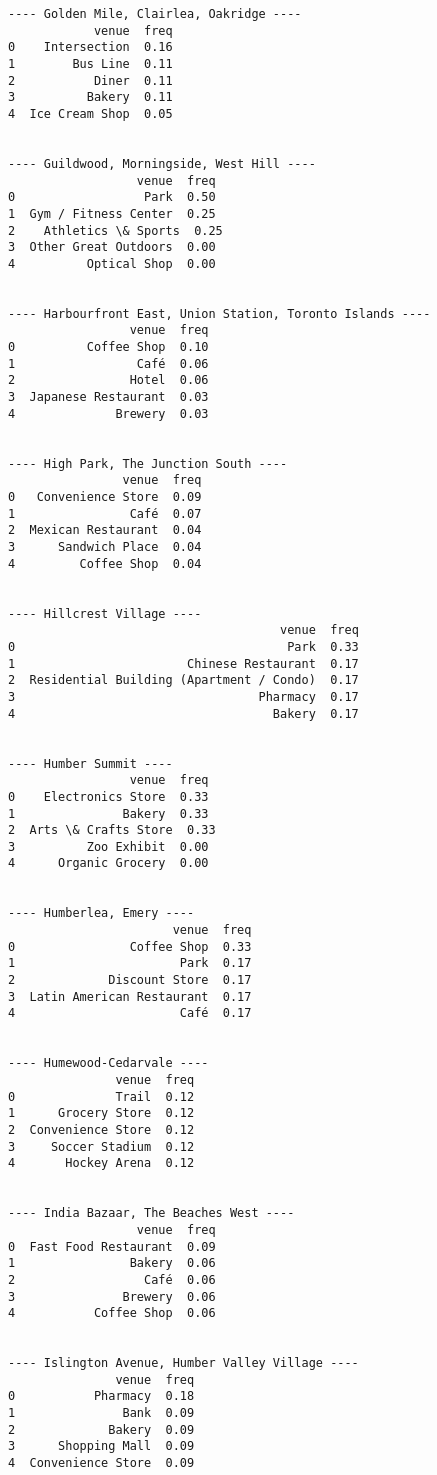 \documentclass[11pt]{article}
\begin{document}
\begin{Verbatim}[commandchars=\\\{\}]
---- Golden Mile, Clairlea, Oakridge ----
            venue  freq
0    Intersection  0.16
1        Bus Line  0.11
2           Diner  0.11
3          Bakery  0.11
4  Ice Cream Shop  0.05


---- Guildwood, Morningside, West Hill ----
                  venue  freq
0                  Park  0.50
1  Gym / Fitness Center  0.25
2    Athletics \& Sports  0.25
3  Other Great Outdoors  0.00
4          Optical Shop  0.00


---- Harbourfront East, Union Station, Toronto Islands ----
                 venue  freq
0          Coffee Shop  0.10
1                 Café  0.06
2                Hotel  0.06
3  Japanese Restaurant  0.03
4              Brewery  0.03


---- High Park, The Junction South ----
                venue  freq
0   Convenience Store  0.09
1                Café  0.07
2  Mexican Restaurant  0.04
3      Sandwich Place  0.04
4         Coffee Shop  0.04


---- Hillcrest Village ----
                                      venue  freq
0                                      Park  0.33
1                        Chinese Restaurant  0.17
2  Residential Building (Apartment / Condo)  0.17
3                                  Pharmacy  0.17
4                                    Bakery  0.17


---- Humber Summit ----
                 venue  freq
0    Electronics Store  0.33
1               Bakery  0.33
2  Arts \& Crafts Store  0.33
3          Zoo Exhibit  0.00
4      Organic Grocery  0.00


---- Humberlea, Emery ----
                       venue  freq
0                Coffee Shop  0.33
1                       Park  0.17
2             Discount Store  0.17
3  Latin American Restaurant  0.17
4                       Café  0.17


---- Humewood-Cedarvale ----
               venue  freq
0              Trail  0.12
1      Grocery Store  0.12
2  Convenience Store  0.12
3     Soccer Stadium  0.12
4       Hockey Arena  0.12


---- India Bazaar, The Beaches West ----
                  venue  freq
0  Fast Food Restaurant  0.09
1                Bakery  0.06
2                  Café  0.06
3               Brewery  0.06
4           Coffee Shop  0.06


---- Islington Avenue, Humber Valley Village ----
               venue  freq
0           Pharmacy  0.18
1               Bank  0.09
2             Bakery  0.09
3      Shopping Mall  0.09
4  Convenience Store  0.09



\end{Verbatim}
\end{document}
